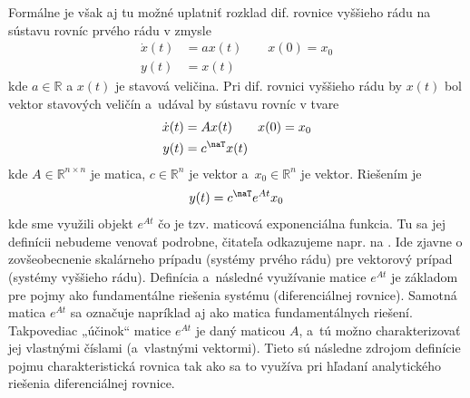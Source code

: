 \documentclass[a4paper, 10pt, ]{article}
\begin{document}
Formálne je však aj tu možné uplatniť rozklad dif. rovnice vyššieho rádu na sústavu rovníc prvého rádu v zmysle
\begin{subequations}
    \begin{align}
        \dot x(t) &= a x(t) \qquad x(0) = x_0 \\
        y(t) &= x(t)
    \end{align}    
\end{subequations}
kde $a \in \mathbb{R}$ a $x(t)$ je stavová veličina. Pri dif. rovnici vyššieho rádu by $x(t)$ bol vektor stavových veličín a~udával by sústavu rovníc v tvare
\begin{subequations}
    \begin{align}
        \dot x(t) &= A x(t) \qquad x(0) = x_0  \\
        y(t) &= c^\naT x(t)
    \end{align}    
\end{subequations}
kde $A \in \mathbb{R}^{n\times n} $ je matica, $c \in \mathbb{R}^{n}$ je vektor a~$x_0 \in \mathbb{R}^{n}$ je vektor. Riešením je
\begin{equation}
    y(t) = c^\naT e^{A t} x_0
\end{equation}
kde sme využili objekt $e^{At}$ čo je tzv. maticová exponenciálna funkcia. Tu sa jej definícii nebudeme venovať podrobne, čitateľa odkazujeme napr. na \cite{Aastroem2020}. Ide zjavne o zovšeobecnenie skalárneho prípadu (systémy prvého rádu) pre vektorový prípad (systémy vyššieho rádu). Definícia a~následné využívanie matice $e^{At}$ je základom pre pojmy ako fundamentálne riešenia systému (diferenciálnej rovnice). Samotná matica $e^{At}$ sa označuje napríklad aj ako matica fundamentálnych riešení. Takpovediac „účinok“ matice $e^{At}$ je daný maticou $A$, a~tú možno charakterizovať jej vlastnými číslami (a~vlastnými vektormi). Tieto sú následne zdrojom definície pojmu charakteristická rovnica tak ako sa to využíva pri hľadaní analytického riešenia diferenciálnej rovnice.
\end{document}
